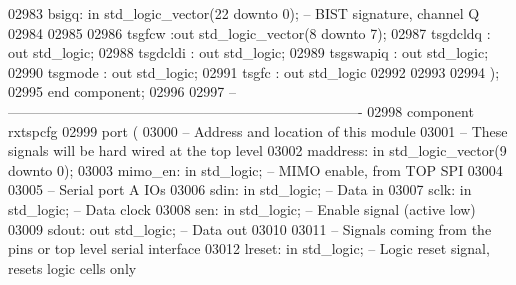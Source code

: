 \begin{DoxyCode}
02983         bsigq: \textcolor{keywordflow}{in} \textcolor{comment}{std\_logic\_vector}(\textcolor{vhdllogic}{}\textcolor{vhdllogic}{22} \textcolor{keywordflow}{downto} \textcolor{vhdllogic}{}\textcolor{vhdllogic}{0});    \textcolor{keyword}{-- BIST signature, channel Q}
02984         
02985 
02986         tsgfcw      :\textcolor{keywordflow}{out} \textcolor{comment}{std\_logic\_vector}(\textcolor{vhdllogic}{}\textcolor{vhdllogic}{8} \textcolor{keywordflow}{downto} \textcolor{vhdllogic}{}\textcolor{vhdllogic}{7});
02987         tsgdcldq    : \textcolor{keywordflow}{out} \textcolor{comment}{std\_logic};
02988         tsgdcldi    : \textcolor{keywordflow}{out} \textcolor{comment}{std\_logic};
02989         tsgswapiq   : \textcolor{keywordflow}{out} \textcolor{comment}{std\_logic};
02990         tsgmode     : \textcolor{keywordflow}{out} \textcolor{comment}{std\_logic};
02991         tsgfc           : \textcolor{keywordflow}{out} \textcolor{comment}{std\_logic}
02992 
02993 
02994     );
02995 \textcolor{keywordflow}{end} \textcolor{keywordflow}{component};
02996 
02997 \textcolor{keyword}{-- ----------------------------------------------------------------------------}
02998 \textcolor{keywordflow}{component} rxtspcfg 
02999     \textcolor{keywordflow}{port} (
03000 \textcolor{keyword}{        -- Address and location of this module}
03001 \textcolor{keyword}{        -- These signals will be hard wired at the top level}
03002         maddress: \textcolor{keywordflow}{in} \textcolor{comment}{std\_logic\_vector}(\textcolor{vhdllogic}{}\textcolor{vhdllogic}{9} \textcolor{keywordflow}{downto} \textcolor{vhdllogic}{}\textcolor{vhdllogic}{0});
03003         mimo\_en: \textcolor{keywordflow}{in} \textcolor{comment}{std\_logic};  \textcolor{keyword}{-- MIMO enable, from TOP SPI}
03004     
03005 \textcolor{keyword}{        -- Serial port A IOs}
03006         sdin: \textcolor{keywordflow}{in} \textcolor{comment}{std\_logic};     \textcolor{keyword}{-- Data in}
03007         sclk: \textcolor{keywordflow}{in} \textcolor{comment}{std\_logic};     \textcolor{keyword}{-- Data clock}
03008         sen: \textcolor{keywordflow}{in} \textcolor{comment}{std\_logic};  \textcolor{keyword}{-- Enable signal (active low)}
03009         sdout: \textcolor{keywordflow}{out} \textcolor{comment}{std\_logic};   \textcolor{keyword}{-- Data out}
03010     
03011 \textcolor{keyword}{        -- Signals coming from the pins or top level serial interface}
03012         lreset: \textcolor{keywordflow}{in} \textcolor{comment}{std\_logic};   \textcolor{keyword}{-- Logic reset signal, resets logic cells only}

\end{DoxyCode}

